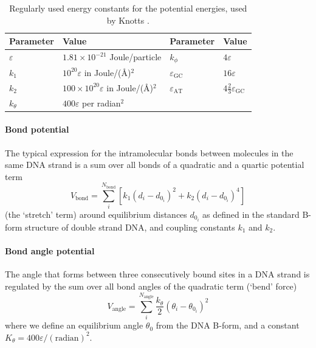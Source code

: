 \begin{table}[hbt]\begin{center}
\begin{tabular}{llll}
Parameter & Value \qquad \qquad \qquad \qquad & Parameter & Value\\
\hline
$\varepsilon$ & $1.81\times10^{-21}$ Joule/particle\qquad\qquad & $k_\phi$ & $4\varepsilon$ \\
$k_1$ & $10^{20}\varepsilon$ in Joule/(\AA)$^2$ & $\varepsilon_\text{GC}$ & $16\varepsilon$\\

$k_2$ & $100\times10^{20}\varepsilon$ in Joule/(\AA)$^2$ & $\varepsilon_\text{AT}$ & $4\frac{2}{3} \varepsilon_\text{GC}$ \\
$k_\theta$ & $400\varepsilon$ per radian$^2$ & & \\
\end{tabular}
\caption{Regularly used energy constants for the potential energies, used by Knotts \etal \cite{knotts2007coarse}.}\end{center}
\end{table}

\paragraph{Bond potential} The typical expression for the intramolecular bonds between molecules in the same DNA strand is a sum over all bonds of a quadratic and a quartic potential term
\begin{equation}
V_{\text{bond}} = \sum_i^{N_{\text{bond}}} \left[ k_1 \left(d_i - d_{0_i}\right)^2 + k_2 \left(d_i - d_{0_i}\right)^4\right]
\end{equation}
(the `stretch' term) around equilibrium distances $d_{0_i}$ as defined in the standard B-form structure of double strand DNA, and coupling constants $k_1$ and $k_2$.

\paragraph{Bond angle potential} The angle that forms between three consecutively bound sites in a DNA strand is regulated by the sum over all bond angles of the quadratic term (`bend' force)
\begin{equation}
V_\text{angle} =  \sum_i^{N_\text{angle}} \frac{k_\theta}{2} \left( \theta_i - \theta_{0_i} \right)^2
\end{equation}
where we define an equilibrium angle $\theta_0$ from the DNA B-form, and a constant $K_\theta = 400\varepsilon / (\text{radian})^ 2$.

